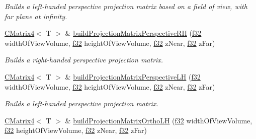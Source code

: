 \begin{DoxyCompactItemize}
\begin{DoxyCompactList}\small\item\em Builds a left-\/handed perspective projection matrix based on a field of view, with far plane at infinity. \end{DoxyCompactList}\item 
\mbox{\label{classirr_1_1core_1_1CMatrix4_a649a29922f622503399bcb16c97b78b4}} 
\hyperlink{classirr_1_1core_1_1CMatrix4}{C\+Matrix4}$<$ T $>$ \& \hyperlink{classirr_1_1core_1_1CMatrix4_a649a29922f622503399bcb16c97b78b4}{build\+Projection\+Matrix\+Perspective\+RH} (\hyperlink{namespaceirr_a0277be98d67dc26ff93b1a6a1d086b07}{f32} width\+Of\+View\+Volume, \hyperlink{namespaceirr_a0277be98d67dc26ff93b1a6a1d086b07}{f32} height\+Of\+View\+Volume, \hyperlink{namespaceirr_a0277be98d67dc26ff93b1a6a1d086b07}{f32} z\+Near, \hyperlink{namespaceirr_a0277be98d67dc26ff93b1a6a1d086b07}{f32} z\+Far)
\begin{DoxyCompactList}\small\item\em Builds a right-\/handed perspective projection matrix. \end{DoxyCompactList}\item 
\mbox{\label{classirr_1_1core_1_1CMatrix4_a8306f02451b06f8e6710f23631654086}} 
\hyperlink{classirr_1_1core_1_1CMatrix4}{C\+Matrix4}$<$ T $>$ \& \hyperlink{classirr_1_1core_1_1CMatrix4_a8306f02451b06f8e6710f23631654086}{build\+Projection\+Matrix\+Perspective\+LH} (\hyperlink{namespaceirr_a0277be98d67dc26ff93b1a6a1d086b07}{f32} width\+Of\+View\+Volume, \hyperlink{namespaceirr_a0277be98d67dc26ff93b1a6a1d086b07}{f32} height\+Of\+View\+Volume, \hyperlink{namespaceirr_a0277be98d67dc26ff93b1a6a1d086b07}{f32} z\+Near, \hyperlink{namespaceirr_a0277be98d67dc26ff93b1a6a1d086b07}{f32} z\+Far)
\begin{DoxyCompactList}\small\item\em Builds a left-\/handed perspective projection matrix. \end{DoxyCompactList}\item 
\mbox{\label{classirr_1_1core_1_1CMatrix4_ae4a0618e2da724a26a5d8a201a63d8a5}} 
\hyperlink{classirr_1_1core_1_1CMatrix4}{C\+Matrix4}$<$ T $>$ \& \hyperlink{classirr_1_1core_1_1CMatrix4_ae4a0618e2da724a26a5d8a201a63d8a5}{build\+Projection\+Matrix\+Ortho\+LH} (\hyperlink{namespaceirr_a0277be98d67dc26ff93b1a6a1d086b07}{f32} width\+Of\+View\+Volume, \hyperlink{namespaceirr_a0277be98d67dc26ff93b1a6a1d086b07}{f32} height\+Of\+View\+Volume, \hyperlink{namespaceirr_a0277be98d67dc26ff93b1a6a1d086b07}{f32} z\+Near, \hyperlink{namespaceirr_a0277be98d67dc26ff93b1a6a1d086b07}{f32} z\+Far)

\end{DoxyCompactItemize}
